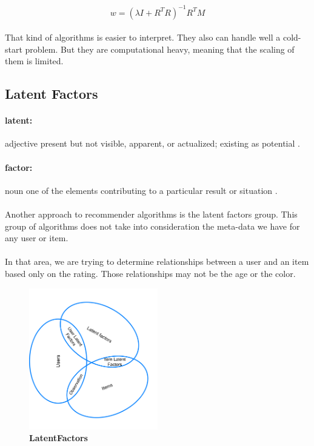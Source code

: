 \begin{equation}
w=(\lambda I + R^{T}R)^{-1} R^{T}M 
\end{equation}

\paragraph{}That kind of algorithms is easier to interpret. They also can handle well a cold-start problem. But they are computational heavy, meaning that the scaling of them is limited.

\subsection{Latent Factors}

\paragraph{latent:} adjective present but not visible, apparent, or actualized; existing as potential \cite{Dictionary.com2017}.
\paragraph{factor:} noun one of the elements contributing to a particular result or situation \cite{Dictionary.com2017}.

\paragraph{}Another approach to recommender algorithms is the latent factors group. This group of algorithms does not take into consideration the meta-data we have for any user or item. 
\paragraph{}In that area, we are trying to determine relationships between a user and an item based only on the rating. Those relationships may not be the age or the color.

\begin{figure}[h]
	\centering
	\includegraphics[width=0.5\textwidth]{images/LatentFactors.png}
	\caption{\bfseries LatentFactors}
	\label{LatentFactors}
\end{figure}


